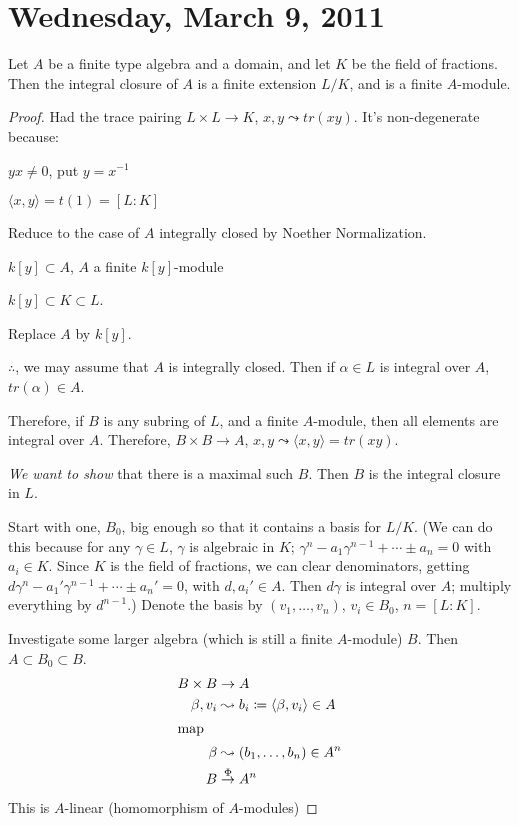 \documentclass [letterpaper,11pt,twoside]{article}
\begin{document}
\setcounter {section}{14}\section {Wednesday, March 9, 2011}
  \begin{thm*}
    Let $A$ be a finite type algebra and a domain, and let $K$ be the field of fractions.  Then the integral closure of $A$ is a finite extension $L / K$, and is a finite $A$-module.
  \end{thm*}
  \begin{proof}
    Had the trace pairing $L \times L \to K$, $x, y \leadsto tr(xy)$.  It's non-degenerate because:

    $y x \ne 0$, put $y = x^{-1}$

    $\langle x, y \rangle = t(1) = [L:K]$

    Reduce to the case of $A$ integrally closed by Noether Normalization.

    $k[y] \subset A$, $A$ a finite $k[y]$-module

    $k[y] \subset K \subset L$.

    Replace $A$ by $k[y]$.

    $\therefore$, we may assume that $A$ is integrally closed.  Then if $\alpha \in L$ is integral over $A$, $tr(\alpha) \in A$.

    Therefore, if $B$ is any subring of $L$, and a finite $A$-module, then all elements are integral over $A$.  Therefore, $B\times B \to A$, $x, y \leadsto \langle x, y\rangle = tr(xy)$.

    \emph{We want to show} that there is a maximal such $B$.  Then $B$ is the integral closure in $L$.

    Start with one, $B_0$, big enough so that it contains a basis for $L / K$.  (We can do this because for any $\gamma\in L$, $\gamma$ is algebraic in $K$; $\gamma^n - a_1 \gamma^{n-1} + \cdots \pm a_n = 0$ with $a_i\in K$.  Since $K$ is the field of fractions, we can clear denominators, getting $d\gamma^n - a_1' \gamma^{n-1} + \cdots \pm a_n' = 0$, with $d, a_i'\in A$.  Then $d\gamma$ is integral over $A$; multiply everything by $d^{n-1}$.)  Denote the basis by $(v_1, \ldots, v_n)$, $v_i\in B_0$, $n = [L:K]$.

    Investigate some larger algebra (which is still a finite $A$-module) $B$.  Then $A\subset B_0 \subset B$.
    \begin{align*}
      B \times B & \to A \\
      \beta, v_i & \leadsto b_i \coloneqq \langle \beta, v_i\rangle\in A \\
      \intertext{map}
      \beta & \leadsto (b_1, \ldots, b_n)\in A^n \\
      B & \stackrel{\Phi}{\to} A^n
    \end{align*}
    This is $A$-linear (homomorphism of $A$-modules)


\end{proof}
\end{document}
